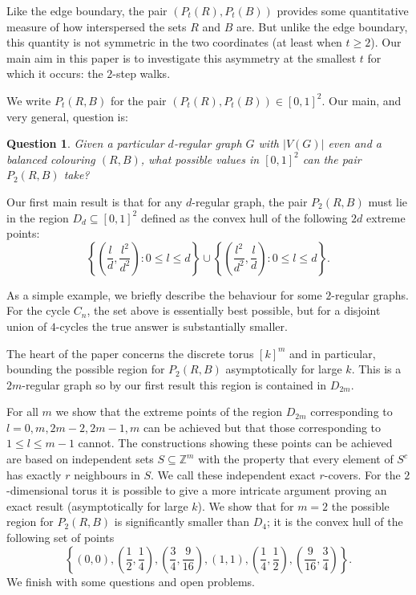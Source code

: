 \documentclass[12pt,a4paper]{article}
\newcommand{\Z}{\mathbb Z}
\newtheorem{q}[thm]{Question}
\begin{document}
Like the edge boundary, the pair $(P_t(R),P_t(B))$ provides some quantitative measure of how interspersed the sets $R$ and $B$ are. But unlike the edge boundary, this quantity is not symmetric in the two coordinates (at least when $t\geq 2$). Our main aim in this paper is to investigate this asymmetry at the smallest $t$ for which it occurs: the $2$-step walks. 

We write $P_t(R,B)$ for the pair $(P_t(R),P_t(B))\in[0,1]^2$. Our main, and very general, question is:  

\begin{q}
Given a particular $d$-regular graph $G$ with $|V(G)|$ even and a balanced colouring $(R,B)$, what possible values in $[0,1]^2$ can the pair $P_2(R,B)$ take?
\end{q}

Our first main result is that for any $d$-regular graph, the pair $P_2(R,B)$ must lie in the region $D_d\subseteq[0,1]^2$ defined as the convex hull of the following $2d$ extreme points: 
\[
\left\{\left(\frac{l}{d},\frac{l^2}{d^2}\right):0 \leq l \leq d\right\} \cup \left\{\left(\frac{l^2}{d^2},\frac{l}{d}\right):0 \leq l \leq d\right\}.
\]

As a simple example, we briefly describe the behaviour for some $2$-regular graphs. For the cycle $C_n$, the set above is essentially best possible, but for a disjoint union of $4$-cycles the true answer is substantially smaller.

The heart of the paper concerns the discrete torus $[k]^m$ and in particular, bounding the possible region for $P_2(R,B)$ asymptotically for large $k$. This is a $2m$-regular graph so by our first result this region is contained in $D_{2m}$.

For all $m$ we show that the extreme points of the region $D_{2m}$ corresponding to $l=0,m,2m-2,2m-1,m$ can be achieved but that those corresponding to $1\leq l\leq m-1$ cannot. The constructions showing these points can be achieved are based on independent sets $S\subseteq\Z^m$ with the property that every element of $S^c$ has exactly $r$ neighbours in $S$. We call these independent exact $r$-covers. For the $2$-dimensional torus it is possible to give a more intricate argument proving an exact result (asymptotically for large $k$). We show that for $m=2$ the possible region for $P_2(R,B)$ is significantly smaller than $D_4$; it is the convex hull of the following set of points
\[
\left\{\left(0,0\right),\left(\frac{1}{2},\frac{1}{4}\right),\left(\frac{3}{4},\frac{9}{16}\right),\left(1,1\right),\left(\frac{1}{4},\frac{1}{2}\right),\left(\frac{9}{16},\frac{3}{4}\right)\right\}.
\]
We finish with some questions and open problems.
\end{document}

